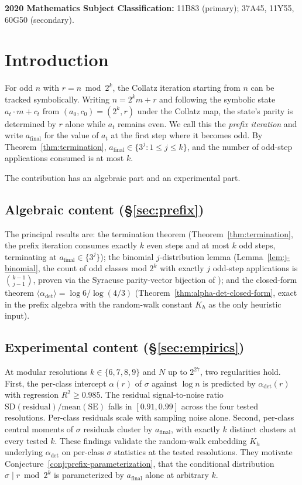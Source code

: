 \documentclass[pdflatex,sn-mathphys-num]{sn-jnl}
\theoremstyle{thmstyleone}%
\theoremstyle{definition}
\theoremstyle{plain}
\begin{document}
\noindent\textbf{2020 Mathematics Subject Classification:} 11B83 (primary); 37A45, 11Y55, 60G50 (secondary).

\section{Introduction}
For odd $n$ with $r = n \bmod 2^k$, the Collatz iteration starting from $n$ can be tracked symbolically. Writing $n = 2^k m + r$ and following the symbolic state $a_t \cdot m + c_t$ from $(a_0, c_0) = (2^k, r)$ under the Collatz map, the state's parity is determined by $r$ alone while $a_t$ remains even. We call this the \emph{prefix iteration} and write $a_{\text{final}}$ for the value of $a_t$ at the first step where it becomes odd. By Theorem~\ref{thm:termination}, $a_{\text{final}} \in \{3^j : 1 \leq j \leq k\}$, and the number of odd-step applications consumed is at most $k$.
 
The contribution has an algebraic part and an experimental part.
 
\subsection{Algebraic content (\S\ref{sec:prefix})} The principal results are: the termination theorem (Theorem~\ref{thm:termination}, the prefix iteration consumes exactly $k$ even steps and at most $k$ odd steps, terminating at $a_{\text{final}} \in \{3^j\}$); the binomial $j$-distribution lemma (Lemma~\ref{lem:j-binomial}, the count of odd classes mod $2^k$ with exactly $j$ odd-step applications is $\binom{k-1}{j-1}$, proven via the Syracuse parity-vector bijection of \citet{terras1976}); and the closed-form theorem $\langle \alpha_{\text{det}} \rangle = \log 6 / \log(4/3)$ (Theorem~\ref{thm:alpha-det-closed-form}, exact in the prefix algebra with the random-walk constant $K_h$ as the only heuristic input).
 
\subsection{Experimental content (\S\ref{sec:empirics})} At modular resolutions $k \in \{6, 7, 8, 9\}$ and $N$ up to $2^{27}$, two regularities hold. First, the per-class intercept $\alpha(r)$ of $\sigma$ against $\log n$ is predicted by $\alpha_{\text{det}}(r)$ with regression $R^2 \geq 0.985$. The residual signal-to-noise ratio $\mathrm{SD}(\text{residual})/\mathrm{mean}(\mathrm{SE})$ falls in $[0.91, 0.99]$ across the four tested resolutions. Per-class residuals scale with sampling noise alone. Second, per-class central moments of $\sigma$ residuals cluster by $a_{\text{final}}$, with exactly $k$ distinct clusters at every tested $k$. These findings validate the random-walk embedding $K_h$ underlying $\alpha_{\text{det}}$ on per-class $\sigma$ statistics at the tested resolutions. They motivate Conjecture~\ref{conj:prefix-parameterization}, that the conditional distribution $\sigma \mid r \bmod 2^k$ is parameterized by $a_{\text{final}}$ alone at arbitrary $k$.
 
\end{document}
